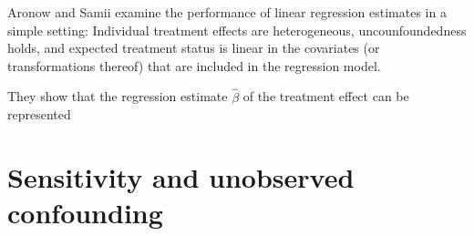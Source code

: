 \documentclass[hidelinks,11pt]{article}
\begin{document}
\subsubsection{\citet{aronowsamii2016}}

Aronow and Samii examine the performance of linear regression estimates in a simple setting: Individual treatment effects are heterogeneous, uncounfoundedness holds, and expected treatment status is linear in the covariates (or transformations thereof) that are included in the regression model. 

They show that the regression estimate $\hat \beta$ of the treatment effect can be represented 

\subsubsection{\citet{sloczynski2020}}


\section{Sensitivity and unobserved confounding}
      


      

\end{document}
